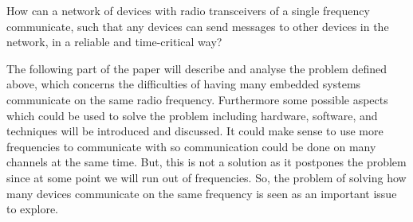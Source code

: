 \medskip
{\addtolength{\leftskip}{10mm}\addtolength{\rightskip}{10mm}\noindent\hrulefill\it

\noindent How can a network of devices with radio transceivers of a single frequency communicate, such that any devices can send messages to other devices in the network, in a reliable and time-critical way?

\noindent\hrulefill

}

\bigskip \noindent
The following part of the paper will describe and analyse the problem defined above, which concerns the difficulties of having many embedded systems communicate on the same radio frequency.
Furthermore some possible aspects which could be used to solve the problem including hardware, software, and techniques will be introduced and discussed.
It could make sense to use more frequencies to communicate with so communication could be done on many channels at the same time.
But, this is not a solution as it postpones the problem since at some point we will run out of frequencies. 
So, the problem of solving how many devices communicate on the same frequency is seen as an important issue to explore.